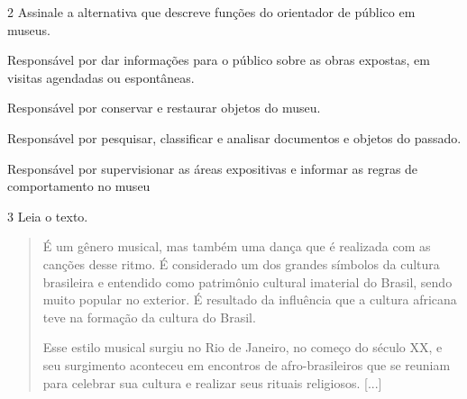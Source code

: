 \num{2} Assinale a alternativa que descreve funções do orientador de público em museus.

\begin{escolha}
\item
  Responsável por dar informações para o público sobre as obras
  expostas, em visitas agendadas ou espontâneas.
\item
  Responsável por conservar e restaurar objetos do museu.
\item
  Responsável por pesquisar, classificar e analisar documentos e objetos
  do passado.
\item
  Responsável por supervisionar as áreas expositivas e informar as
  regras de comportamento no museu
\end{escolha}


\num{3}  Leia o texto.

\begin{quote}
É um gênero musical, mas também uma dança que é realizada com as canções
desse ritmo. É considerado um dos grandes símbolos da cultura brasileira
e entendido como patrimônio cultural imaterial do Brasil, sendo muito
popular no exterior. É resultado da influência que a cultura africana
teve na formação da cultura do Brasil.

Esse estilo musical surgiu no Rio de Janeiro, no começo do século XX, e
seu surgimento aconteceu em encontros de afro-brasileiros que se reuniam
para celebrar sua cultura e realizar seus rituais religiosos. {[}...{]}

\end{quote}

